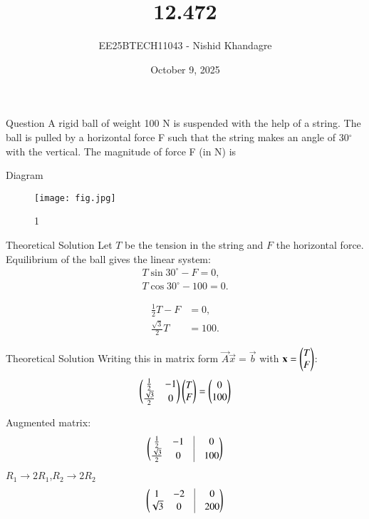\documentclass{beamer}
\title
{12.472}
\date{October 9, 2025}
\author
{EE25BTECH11043 - Nishid Khandagre}
\begin{document}
\frame{\titlepage}

\begin{frame}{Question}
A rigid ball of weight 100 N is suspended with the help of a string. The ball is pulled by a horizontal force F such that the string makes an angle of 30$^\circ$ with the vertical. The magnitude of force F (in N) is
\end{frame}

\begin{frame}{Diagram}
\begin{figure}[H]
\centering
\texttt{[image: fig.jpg]}
\caption{1}
\label{fig:fig}
\end{figure}
\end{frame}

\begin{frame}{Theoretical Solution}
Let $T$ be the tension in the string and $F$ the horizontal force.
Equilibrium of the ball gives the linear system:
\begin{align}
T\sin 30^\circ - F = 0, \\
T\cos 30^\circ - 100 = 0.
\end{align}

\begin{align}
\frac{1}{2}T - F &= 0, \\
\frac{\sqrt3}{2}T &= 100.
\end{align}
\end{frame}

\begin{frame}{Theoretical Solution}
Writing this in matrix form $\vec{A}\vec{x}=\vec{b}$ with $\mathbf{x}=\begin{pmatrix}T \\ F\end{pmatrix}$:
\begin{align}
\begin{pmatrix}
\frac12 & -1 \\
\frac{\sqrt3}{2} & 0
\end{pmatrix}
\begin{pmatrix}T \\ F\end{pmatrix}
=
\begin{pmatrix}0 \\ 100\end{pmatrix}
\end{align}

Augmented matrix:
\begin{align}
\myvec{
\frac12 & -1 & \vrule & 0 \\
\frac{\sqrt3}{2} & 0 & \vrule & 100
}
\end{align}
$R_1 \rightarrow 2R_1$,$R_2 \rightarrow 2R_2$
\begin{align}
\myvec{
1 & -2 & \vrule & 0 \\
\sqrt3 & 0 & \vrule & 200
}
\end{align}
\end{frame}
\end{document}
